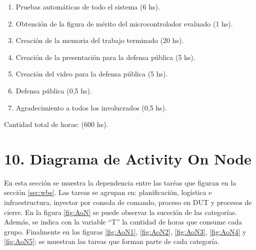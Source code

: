 \documentclass[
11pt, %
]{charter}
\begin{document}
\begin{enumerate}
\begin{enumerate}
		\item Pruebas automáticas de todo el sistema (6 hs).
		\item Obtención de la figura de mérito del microcontrolador evaluado (1 hs).
		\item Creación de la memoria del trabajo terminado (20 hs).
		\item Creación de la presentación para la defensa pública (5 hs).
		\item Creación del video para la defensa pública (5 hs).
		\item Defensa pública (0,5 hs).
		\item Agradecimiento a todos los involucrados (0,5 hs).
	\end{enumerate}
\end{enumerate}

Cantidad total de horas: (600 hs).

\section{10. Diagrama de Activity On Node}
\label{sec:AoN}

En esta sección se muestra la dependencia entre las taréas que figuran en la sección \ref{sec:wbs}.
Las tareas se agrupan en: planificación, logística e infraestructura, inyector por consola de comando, proceso en DUT y procesos de cierre.
En la figura \ref{fig:AoN} se puede observar la suceción de las categorías.
Además, se indica con la variable ``T'' la cantidad de horas que consume cada grupo.
Finalmente en las figuras \ref{fig:AoN1}, \ref{fig:AoN2}, \ref{fig:AoN3}, \ref{fig:AoN4} y \ref{fig:AoN5}; se muestran las tareas que forman parte de cada categoría.
\end{document}
